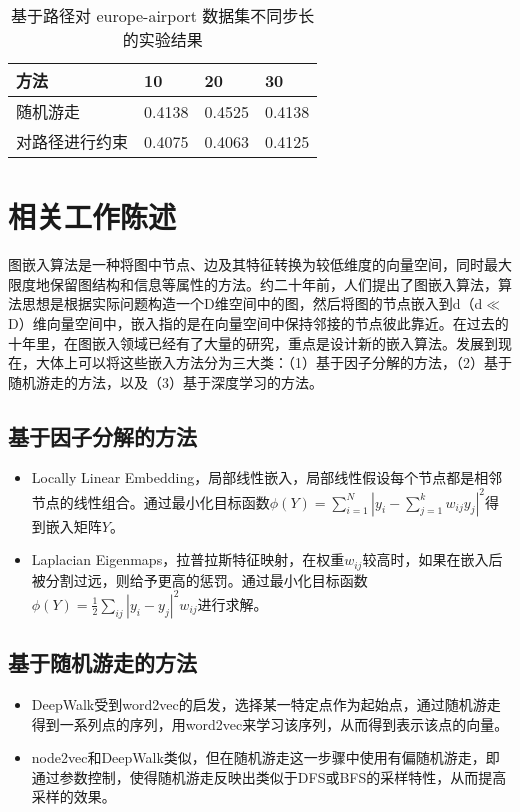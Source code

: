 \documentclass{ctexart}
\begin{document}
\begin{table}[!t]
\renewcommand{\arraystretch}{1.1}
\caption{基于路径对 europe-airport 数据集不同步长的实验结果}
\label{exp: europe-path}
\centering
\begin{tabular}{|l|l|l|l|}
    \hline
    方法 & 10 & 20 & 30 \\
    \hline
    随机游走 & 0.4138 & 0.4525 & 0.4138 \\
    \hline
    对路径进行约束 & 0.4075 & 0.4063 & 0.4125 \\
    \hline
\end{tabular}
\end{table}

\section{相关工作陈述}

图嵌入算法是一种将图中节点、边及其特征转换为较低维度的向量空间，同时最大限度地保留图结构和信息等属性的方法。约二十年前，人们提出了图嵌入算法，算法思想是根据实际问题构造一个D维空间中的图，然后将图的节点嵌入到d（d$\ll$D）维向量空间中，嵌入指的是在向量空间中保持邻接的节点彼此靠近。在过去的十年里，在图嵌入领域已经有了大量的研究，重点是设计新的嵌入算法。发展到现在，大体上可以将这些嵌入方法分为三大类：（1）基于因子分解的方法，（2）基于随机游走的方法，以及（3）基于深度学习的方法\cite{goyal2018graph}。

\subsection{基于因子分解的方法}

\begin{itemize}
    \item Locally Linear Embedding，局部线性嵌入，局部线性假设每个节点都是相邻节点的线性组合。通过最小化目标函数$\phi(Y)=\sum_{i=1}^N|y_i-\sum_{j=1}^kw_{ij}y_j|^2$得到嵌入矩阵$Y$。
    \item Laplacian Eigenmaps，拉普拉斯特征映射，在权重$w_{ij}$较高时，如果在嵌入后被分割过远，则给予更高的惩罚。通过最小化目标函数$\phi(Y)=\frac{1}{2}\sum_{ij} |y_i-y_j|^2w_{ij}$进行求解。
\end{itemize}

\subsection{基于随机游走的方法}

\begin{itemize}
    \item DeepWalk受到word2vec的启发，选择某一特定点作为起始点，通过随机游走得到一系列点的序列，用word2vec来学习该序列，从而得到表示该点的向量。
    \item node2vec和DeepWalk类似，但在随机游走这一步骤中使用有偏随机游走，即通过参数控制，使得随机游走反映出类似于DFS或BFS的采样特性，从而提高采样的效果。
\end{itemize}
\end{document}
